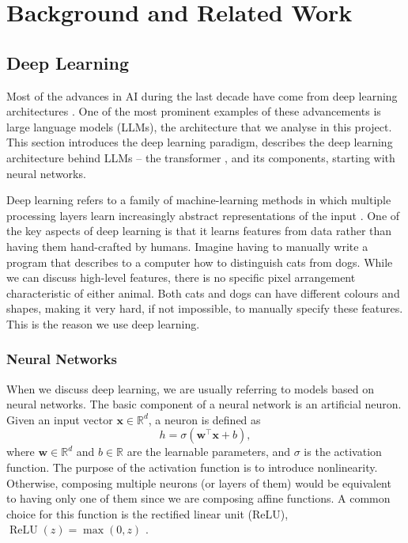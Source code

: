 \chapter{Background and Related Work}
\label{ch:background_related_work}

\section{Deep Learning}
\label{sec:deep_learning}
Most of the advances in AI during the last decade have come from deep learning architectures \citep{mnih2013atari, silver2017alphazero, brown2020language_models, Jumper2021alpha_fold}. One of the most prominent examples of these advancements is large language models (LLMs), the architecture that we analyse in this project. This section introduces the deep learning paradigm, describes the deep learning architecture behind LLMs -- the transformer \citep{vaswani2017attention}, and its components, starting with neural networks.

Deep learning refers to a family of machine-learning methods in which multiple processing layers learn increasingly abstract representations of the input \citep{lecun2015deep_learning}. One of the key aspects of deep learning is that it learns features from data rather than having them hand-crafted by humans. Imagine having to manually write a program that describes to a computer how to distinguish cats from dogs. While we can discuss high-level features, there is no specific pixel arrangement characteristic of either animal. Both cats and dogs can have different colours and shapes, making it very hard, if not impossible, to manually specify these features. This is the reason we use deep learning.

\subsection{Neural Networks}
\label{subsec:neural_networks}

When we discuss deep learning, we are usually referring to models based on neural networks. The basic component of a neural network is an artificial neuron. Given an input vector $\mathbf{x} \in \mathbb{R}^{d}$, a neuron is defined as
\begin{equation}
    h = \sigma(\mathbf{w}^{\top}\mathbf{x} + b),
    \label{eq:artificial_neuron}
\end{equation}
where $\mathbf{w} \in \mathbb{R}^{d}$ and $b \in \mathbb{R}$ are the learnable parameters, and $\sigma$ is the activation function. The purpose of the activation function is to introduce nonlinearity. Otherwise, composing multiple neurons (or layers of them) would be equivalent to having only one of them since we are composing affine functions. A common choice for this function is the rectified linear unit (ReLU), $\operatorname{ReLU}(z)=\max(0,z)$ \citep{glorot2011deep_sparse_rectifier}.

